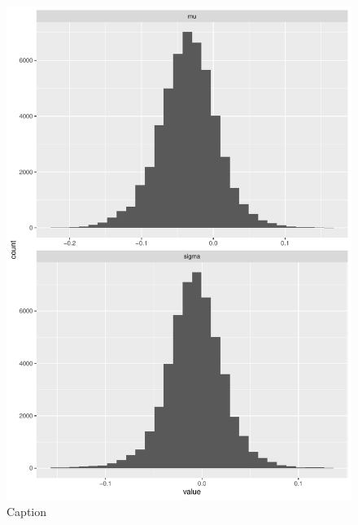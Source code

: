 \begin{figure}[H]
    \centering
    \includegraphics[scale = 0.7, page = 4]{figures/test.pdf}
    \caption{Caption}
    \label{fig:my_label}
\end{figure}{}

